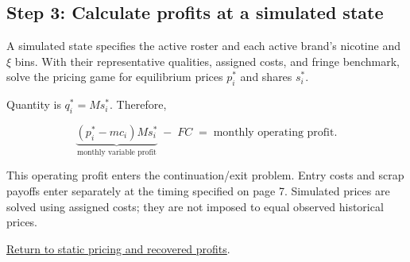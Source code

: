\documentclass[11pt,]{article}
\begin{document}
\subsection{Step 3: Calculate profits at a simulated
state}\label{step-3-calculate-profits-at-a-simulated-state}

A simulated state specifies the active roster and each active brand's
nicotine and \(\xi\) bins. With their representative qualities, assigned
costs, and fringe benchmark, solve the pricing game for equilibrium
prices \(p_i^*\) and shares \(s_i^*\).

Quantity is \(q_i^*=Ms_i^*\). Therefore,

\[
\underbrace{(p_i^*-mc_i)Ms_i^*}_{\text{monthly variable profit}}
\; -\; FC
\;=\;\text{monthly operating profit}.
\]

This operating profit enters the continuation/exit problem. Entry costs
and scrap payoffs enter separately at the timing specified on page 7.
Simulated prices are solved using assigned costs; they are not imposed
to equal observed historical prices.

\protect\hyperlink{static-bertrand-pricing-and-recovered-profits}{Return
to static pricing and recovered profits}.
\end{document}
